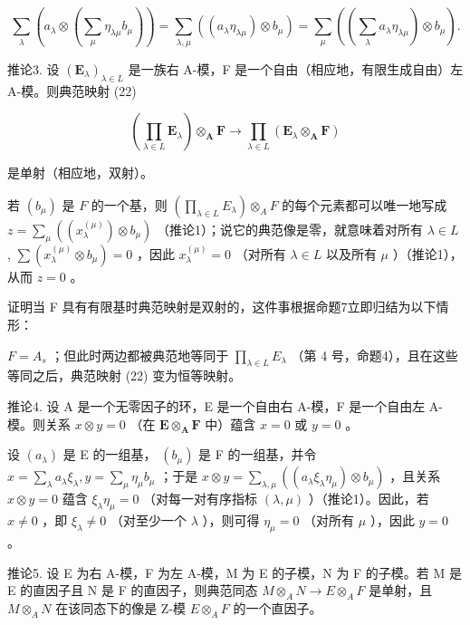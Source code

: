 \[
\sum_ {\lambda} \left(a _ {\lambda} \otimes \left(\sum_ {\mu} \eta_ {\lambda \mu} b _ {\mu}\right)\right) = \sum_ {\lambda , \mu} \left((a _ {\lambda} \eta_ {\lambda \mu}) \otimes b _ {\mu}\right) = \sum_ {\mu} \left(\left(\sum_ {\lambda} a _ {\lambda} \eta_ {\lambda \mu}\right) \otimes b _ {\mu}\right).
\]

推论3. 设 \((\mathbf{E}_{\lambda})_{\lambda \in L}\) 是一族右 A-模，F 是一个自由（相应地，有限生成自由）左 A-模。则典范映射 (22)

\[
\left(\prod_ {\lambda \in L} \mathbf {E} _ {\lambda}\right) \otimes_ {\mathbf {A}} \mathbf {F} \rightarrow \prod_ {\lambda \in L} \left(\mathbf {E} _ {\lambda} \otimes_ {\mathbf {A}} \mathbf {F}\right)
\]

是单射（相应地，双射）。

若 \((b_{\mu})\) 是 \(F\) 的一个基，则 \(\left(\prod_{\lambda \in L} E_{\lambda}\right) \otimes_{A} F\) 的每个元素都可以唯一地写成 \(z = \sum_{\mu} ((x_{\lambda}^{(\mu)}) \otimes b_{\mu})\) （推论1）；说它的典范像是零，就意味着对所有 \(\lambda \in L\) , \(\sum (x_{\lambda}^{(\mu)} \otimes b_{\mu}) = 0\) ，因此 \(x_{\lambda}^{(\mu)} = 0\) （对所有 \(\lambda \in L\) 以及所有 \(\mu\) ）（推论1），从而 \(z = 0\) 。

证明当 F 具有有限基时典范映射是双射的，这件事根据命题7立即归结为以下情形：

\(F = A_{s}\) ；但此时两边都被典范地等同于 \(\prod_{\lambda \in L} E_{\lambda}\) （第 4 号，命题4），且在这些等同之后，典范映射 (22) 变为恒等映射。

推论4. 设 A 是一个无零因子的环，E 是一个自由右 A-模，F 是一个自由左 A-模。则关系 \(x \otimes y = 0\) （在 \(\mathbf{E} \otimes_{\mathbf{A}} \mathbf{F}\) 中）蕴含 \(x = 0\) 或 \(y = 0\) 。

设 \((a_{\lambda})\) 是 E 的一组基， \((b_{\mu})\) 是 F 的一组基，并令 \(x = \sum_{\lambda} a_{\lambda} \xi_{\lambda}, y = \sum_{\mu} \eta_{\mu} b_{\mu}\) ；于是 \(x \otimes y = \sum_{\lambda, \mu} ((a_{\lambda} \xi_{\lambda} \eta_{\mu}) \otimes b_{\mu})\) ，且关系 \(x \otimes y = 0\) 蕴含 \(\xi_{\lambda} \eta_{\mu} = 0\) （对每一对有序指标 \((\lambda, \mu)\) ）（推论1）。因此，若 \(x \neq 0\) ，即 \(\xi_{\lambda} \neq 0\) （对至少一个 \(\lambda\) ），则可得 \(\eta_{\mu} = 0\) （对所有 \(\mu\) ），因此 \(y = 0\) 。

推论5. 设 E 为右 A-模，F 为左 A-模，M 为 E 的子模，N 为 F 的子模。若 M 是 E 的直因子且 N 是 F 的直因子，则典范同态 \(M \otimes_{A} N \to E \otimes_{A} F\) 是单射，且 \(M \otimes_{A} N\) 在该同态下的像是 Z-模 \(E \otimes_{A} F\) 的一个直因子。

